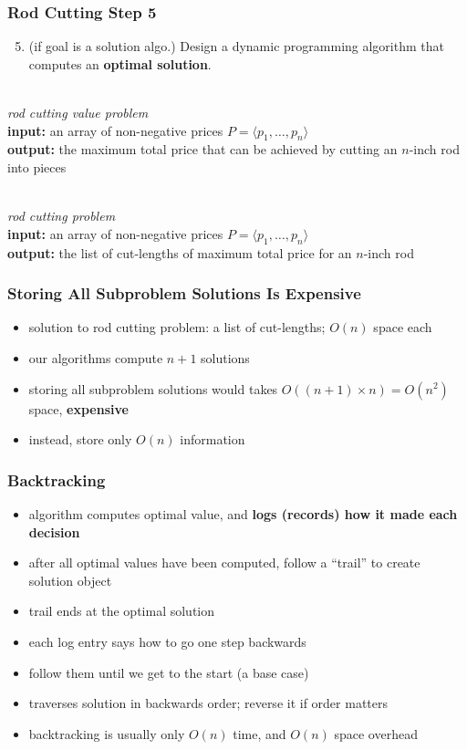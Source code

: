 \documentclass{beamer}
\newcommand{\stanza}{ \\~\ }
\begin{document}
\begin{frame} \frametitle{Rod Cutting Step 5}
  \begin{enumerate}
    \setcounter{enumi}{4}
    \item (if goal is a solution algo.) Design a dynamic programming algorithm that computes an \textbf{optimal solution}.
    \stanza
  \end{enumerate}

  
  \emph{rod cutting value problem} \\
  \textbf{input:} an array of non-negative prices $P=\langle p_1, \ldots, p_n \rangle$ \\
  \textbf{output:} the maximum total price that can be achieved by cutting an $n$-inch rod into pieces
  \stanza

  \emph{rod cutting problem} \\
  \textbf{input:} an array of non-negative prices $P=\langle p_1, \ldots, p_n \rangle$ \\
  \textbf{output:} the list of cut-lengths of maximum total price for an $n$-inch rod

\end{frame}

\begin{frame} \frametitle{Storing All Subproblem Solutions Is Expensive}
  \begin{itemize}
    \item solution to rod cutting problem: a list of cut-lengths; $O(n)$ space each
    \item our algorithms compute $n+1$ solutions
    \item storing all subproblem solutions would takes $O((n+1)\times n) = O(n^2)$ space, \textbf{expensive}
    \item instead, store only $O(n)$ information
  \end{itemize}
\end{frame}

\begin{frame} \frametitle{Backtracking}
  \begin{itemize}
    \item algorithm computes optimal value, and \textbf{logs (records) how it made each decision}
    \item after all optimal values have been computed, follow a ``trail'' to create solution object
    \item trail ends at the optimal solution
    \item each log entry says how to go one step backwards
    \item follow them until we get to the start (a base case)
    \item traverses solution in backwards order; reverse it if order matters
    \item backtracking is usually only $O(n)$ time, and $O(n)$ space overhead
  \end{itemize}
\end{frame}
\end{document}
